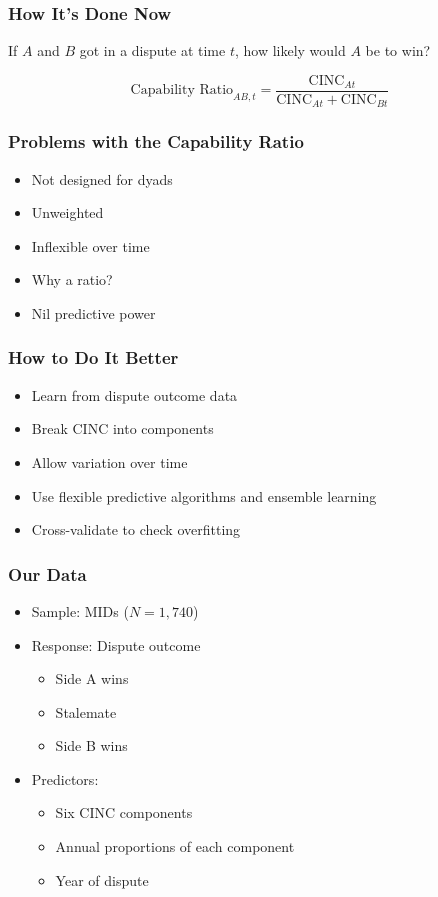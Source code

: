 \documentclass{beamer}
\begin{document}
\begin{frame}
  \frametitle{How It's Done Now}

  If $A$ and $B$ got in a dispute at time $t$, how likely would $A$ be to win?

  \begin{displaymath}
    \text{Capability Ratio}_{AB,t}
    =
    \frac{\text{CINC}_{At}}{\text{CINC}_{At} + \text{CINC}_{Bt}}
  \end{displaymath}
\end{frame}

\begin{frame}
  \frametitle{Problems with the Capability Ratio}

  \begin{itemize}
    \item Not designed for dyads
    \item Unweighted
    \item Inflexible over time
    \item Why a ratio?
    \item Nil predictive power
  \end{itemize}
\end{frame}

\begin{frame}
  \frametitle{How to Do It Better}

  \begin{itemize}
    \item Learn from dispute outcome data

    \item Break CINC into components

    \item Allow variation over time

    \item Use flexible predictive algorithms and ensemble learning

    \item Cross-validate to check overfitting
  \end{itemize}
\end{frame}

\begin{frame}
  \frametitle{Our Data}

  \begin{itemize}
    \item Sample: MIDs ($N = 1{,}740$)
    \item Response: Dispute outcome
    \begin{itemize}
      \item Side A wins
      \item Stalemate
      \item Side B wins
    \end{itemize}
    \item Predictors:
    \begin{itemize}
      \item Six CINC components
      \item Annual proportions of each component
      \item Year of dispute
    \end{itemize}
  \end{itemize}
\end{frame}
\end{document}
